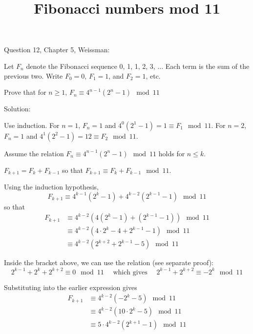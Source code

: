 \documentclass[11pt]{amsart}
\title{Fibonacci numbers mod 11}
\author{}
\begin{document}
\maketitle

Question 12, Chapter 5, Weissman:

Let $F_n$ denote the Fibonacci sequence 0, 1, 1, 2, 3, $\ldots$ Each term is the sum of the previous two. Write $F_0 = 0$, $F_1 = 1$, and $F_2 = 1$, etc. 

Prove that for $n \ge 1$, $F_n \equiv 4^{n-1} (2^{n} - 1) \mod 11$ 

\vspace{2em}

Solution:

\vspace{1em}

Use induction. For $n=1$, $F_{n} = 1$ and $4^{0}(2^{1}-1)=1 \equiv F_{1} \mod 11$. For $n=2$, $F_{n} = 1$ and $4^{1}(2^{2}-1) = 12 \equiv F_{2} \mod 11$.


Assume the relation $F_n \equiv 4^{n-1} (2^{n} - 1) \mod 11$ holds for $n \le k$.

$F_{k+1} = F_{k} + F_{k-1}$ so that $F_{k+1} \equiv F_{k} + F_{k-1} \mod 11$.

Using the induction hypothesis, 
$$
F_{k+1} \equiv 
4^{k-1} (2^{k} - 1) 
+
4^{k-2} (2^{k-1} - 1) 
\mod 11
$$
so that
$$
\begin{aligned}
F_{k+1} 
&\equiv 
4^{k-2} 
\left(
4 (2^{k} - 1) 
+
(2^{k-1} - 1) 
\right)
\mod 11
\\
&\equiv 
4^{k-2} 
\left(
4 \cdot 2^{k} - 4 
+
2^{k-1} - 1
\right)
\mod 11
\\
&\equiv 
4^{k-2} 
\left(
2^{k+2}  
+
2^{k-1} - 5
\right)
\mod 11
\end{aligned}
$$

Inside the bracket above, we can use the relation 
(see separate proof):
$$
2^{k-1} + 2^{k} + 2^{k+2} \equiv 0 \mod 11 
\quad \text{ which gives } \quad
2^{k-1} +  2^{k+2} \equiv - 2^{k} \mod 11 
$$
 

Substituting into the earlier expression gives
$$
\begin{aligned}
F_{k+1} 
&\equiv 
4^{k-2} 
\left(
- 2^{k}  - 5
\right)
\mod 11
\\ &\equiv 
4^{k-2} 
\left(
10 \cdot 2^{k}  - 5
\right)
\mod 11
\\ &\equiv 
5 \cdot 4^{k-2} 
\left(
2^{k+1}  - 1
\right)
\mod 11
\end{aligned}
$$
\end{document}
